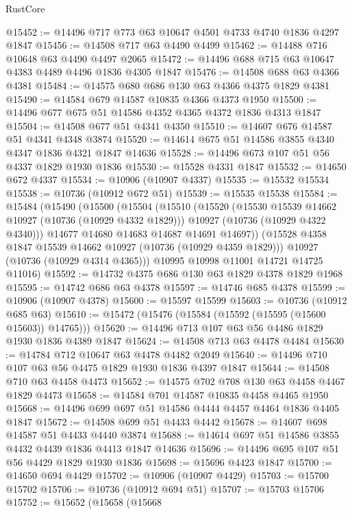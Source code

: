 \begin{lexlean}{RustCore}
\begin{coremodule}
@15452 := @14496 @717 @773 @63 @10647 @4501 @4733 @4740 @1836 @4297 @1847
@15456 := @14508 @717 @63 @4490 @4499
@15462 := @14488 @716 @10648 @63 @4490 @4497 @2065
@15472 := @14496 @688 @715 @63 @10647 @4383 @4489 @4496 @1836 @4305 @1847
@15476 := @14508 @688 @63 @4366 @4381
@15484 := @14575 @680 @686 @130 @63 @4366 @4375 @1829 @4381
@15490 := @14584 @679 @14587 @10835 @4366 @4373 @1950
@15500 := @14496 @677 @675 @51 @14586 @4352 @4365 @4372 @1836 @4313 @1847
@15504 := @14508 @677 @51 @4341 @4350
@15510 := @14607 @676 @14587 @51 @4341 @4348 @3874
@15520 := @14614 @675 @51 @14586 @3855 @4340 @4347 @1836 @4321 @1847 @14636
@15528 := @14496 @673 @107 @51 @56 @4337 @1829 @1930 @1836
@15530 := @15528 @4331 @1847
@15532 := @14650 @672 @4337
@15534 := @10906 (@10907 @4337)
@15535 := @15532 @15534
@15538 := @10736 (@10912 @672 @51)
@15539 := @15535 @15538
@15584 := @15484
    (@15490
      (@15500
        (@15504
          (@15510
            (@15520
              (@15530 @15539 @14662 @10927 (@10736 (@10929 @4332 @1829)))
              @10927
              (@10736 (@10929 @4322 @4340)))
            @14677
            @14680
            @14683
            @14687
            @14691
            @14697))
        (@15528 @4358 @1847 @15539 @14662 @10927 (@10736 (@10929 @4359 @1829)))
        @10927
        (@10736 (@10929 @4314 @4365)))
      @10995
      @10998
      @11001
      @14721
      @14725
      @11016)
@15592 := @14732 @4375 @686 @130 @63 @1829 @4378 @1829 @1968
@15595 := @14742 @686 @63 @4378
@15597 := @14746 @685 @4378
@15599 := @10906 (@10907 @4378)
@15600 := @15597 @15599
@15603 := @10736 (@10912 @685 @63)
@15610 := @15472 (@15476 (@15584 (@15592 (@15595 (@15600 @15603)) @14765)))
@15620 := @14496 @713 @107 @63 @56 @4486 @1829 @1930 @1836 @4389 @1847
@15624 := @14508 @713 @63 @4478 @4484
@15630 := @14784 @712 @10647 @63 @4478 @4482 @2049
@15640 := @14496 @710 @107 @63 @56 @4475 @1829 @1930 @1836 @4397 @1847
@15644 := @14508 @710 @63 @4458 @4473
@15652 := @14575 @702 @708 @130 @63 @4458 @4467 @1829 @4473
@15658 := @14584 @701 @14587 @10835 @4458 @4465 @1950
@15668 := @14496 @699 @697 @51 @14586 @4444 @4457 @4464 @1836 @4405 @1847
@15672 := @14508 @699 @51 @4433 @4442
@15678 := @14607 @698 @14587 @51 @4433 @4440 @3874
@15688 := @14614 @697 @51 @14586 @3855 @4432 @4439 @1836 @4413 @1847 @14636
@15696 := @14496 @695 @107 @51 @56 @4429 @1829 @1930 @1836
@15698 := @15696 @4423 @1847
@15700 := @14650 @694 @4429
@15702 := @10906 (@10907 @4429)
@15703 := @15700 @15702
@15706 := @10736 (@10912 @694 @51)
@15707 := @15703 @15706
@15752 := @15652
    (@15658
      (@15668

\end{coremodule}
\end{lexlean}
